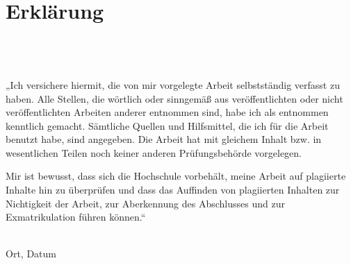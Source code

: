 \section*{Erklärung}

\Author \\
\addressStreet\\
\addressZipCode \\

„Ich versichere hiermit, die von mir vorgelegte Arbeit selbstständig verfasst zu haben. Alle Stellen, die wörtlich oder sinngemäß aus veröffentlichten oder nicht veröffentlichten Arbeiten anderer entnommen sind, habe ich als entnommen kenntlich gemacht. Sämtliche Quellen und Hilfsmittel, die ich für die Arbeit benutzt habe, sind angegeben. Die Arbeit hat mit gleichem Inhalt bzw. in wesentlichen Teilen noch keiner anderen Prüfungsbehörde vorgelegen.

Mir ist bewusst, dass sich die Hochschule vorbehält, meine Arbeit auf plagiierte Inhalte hin zu überprüfen und dass das Auffinden von plagiierten Inhalten zur Nichtigkeit der Arbeit, zur Aberkennung des Abschlusses und zur Exmatrikulation führen können.“
\vspace{3cm}


\noindent\parbox[t]{5cm}{\underline{\hspace{5cm}}\\\noindent Ort, Datum}%
\hfill%
\noindent\parbox[t]{5cm}{\noindent\underline{\hspace{5cm}}\\\noindent \Author}%
